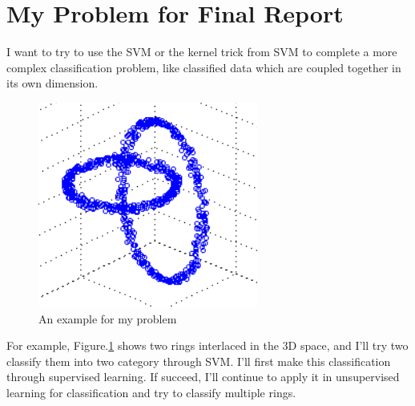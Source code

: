 \documentclass{article}
\begin{document}
\section{My Problem for Final Report}
I want to try to use the SVM or the kernel trick from SVM to complete a more complex classification problem, like classified data which are coupled together in its own dimension.
\begin{figure}[H]
    \centering
    \includegraphics[scale=0.5]{P5.jpg}
    \caption{An example for my problem}
    \label{ring}
\end{figure}
For example, Figure.\ref{ring} shows two rings interlaced in the 3D space, and I'll try two classify them into two category through SVM. I'll first make this classification through supervised learning. If succeed, I'll continue to apply it in unsupervised learning for classification and try to classify multiple rings.
\end{document}
